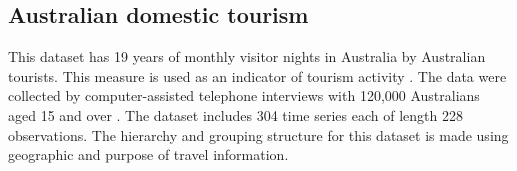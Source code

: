 \documentclass[11pt,a4paper,]{article}
\begin{document}
\hypertarget{australian-domestic-tourism}{%
\subsection{Australian domestic tourism}\label{australian-domestic-tourism}}

This dataset has 19 years of monthly visitor nights in Australia by Australian tourists. This measure is used as an indicator of tourism activity \autocite{mint2018}. The data were collected by computer-assisted telephone interviews with 120,000 Australians aged 15 and over \autocite{researchAustralia2005}. The dataset includes 304 time series each of length 228 observations. The hierarchy and grouping structure for this dataset is made using geographic and purpose of travel information.

\begingroup\fontsize{9}{11}\selectfont
\end{document}
